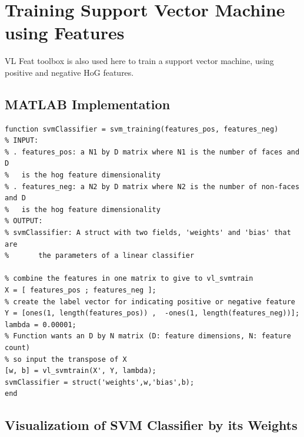 \documentclass{article}
\begin{document}
\section{Training Support Vector Machine using Features}
VL Feat toolbox is also used here to train a support vector machine, using positive and negative HoG features.

\subsection{MATLAB Implementation}

\begin{lstlisting}[caption={My implementation of svm\_training function.},captionpos=b]
function svmClassifier = svm_training(features_pos, features_neg)
% INPUT:
% . features_pos: a N1 by D matrix where N1 is the number of faces and D
%   is the hog feature dimensionality
% . features_neg: a N2 by D matrix where N2 is the number of non-faces and D
%   is the hog feature dimensionality
% OUTPUT:
% svmClassifier: A struct with two fields, 'weights' and 'bias' that are
%       the parameters of a linear classifier

% combine the features in one matrix to give to vl_svmtrain
X = [ features_pos ; features_neg ];
% create the label vector for indicating positive or negative feature 
Y = [ones(1, length(features_pos)) ,  -ones(1, length(features_neg))];
lambda = 0.00001;
% Function wants an D by N matrix (D: feature dimensions, N: feature count)
% so input the transpose of X
[w, b] = vl_svmtrain(X', Y, lambda);
svmClassifier = struct('weights',w,'bias',b);
end
\end{lstlisting}

\newpage

\subsection{Visualizatioın of SVM Classifier by its Weights}
\end{document}
